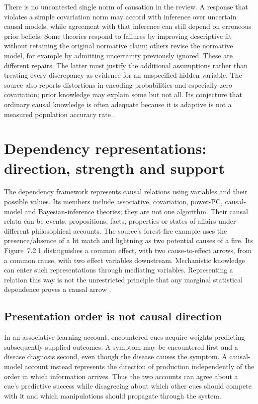 There is no uncontested single norm of causation in the review. A response
that violates a simple covariation norm may accord with inference over
uncertain causal models, while agreement with that inference can still
depend on erroneous prior beliefs. Some theories respond to failures by
improving descriptive fit without retaining the original normative claim;
others revise the normative model, for example by admitting uncertainty
previously ignored. These are different repairs. The latter must justify
the additional assumptions rather than treating every discrepancy as
evidence for an unspecified hidden variable. The source also reports
distortions in encoding probabilities and especially zero covariation;
prior knowledge may explain some but not all. Its conjecture that
ordinary causal knowledge is often adequate because it is adaptive is
not a measured population accuracy rate
\cite[Sec.~2, p.~440]{Waldmann2021EverydayCausal}.

\section{Dependency representations: direction, strength and support}
\label{sec:p19-rat72-dependency}

The dependency framework represents causal relations using variables
and their possible values. Its members include associative, covariation,
power-PC, causal-model and Bayesian-inference theories; they are not
one algorithm. Their causal relata can be events, propositions, facts,
properties or states of affairs under different philosophical accounts.
The source's forest-fire example uses the presence/absence of a lit
match and lightning as two potential causes of a fire. Its Figure~7.2.1
distinguishes a common effect, with two cause-to-effect arrows, from a
common cause, with two effect variables downstream. Mechanistic
knowledge can enter such representations through mediating variables.
Representing a relation this way is not the unrestricted principle that
any marginal statistical dependence proves a causal arrow
\cite[Sec.~3.1, p.~441]{Waldmann2021EverydayCausal}.

\subsection{Presentation order is not causal direction}

In an associative learning account, encountered cues acquire weights
predicting subsequently supplied outcomes. A symptom may be encountered
first and a disease diagnosis second, even though the disease causes
the symptom. A causal-model account instead represents the direction
of production independently of the order in which information arrives.
Thus the two accounts can agree about a cue's predictive success while
disagreeing about which other cues should compete with it and which
manipulations should propagate through the system.

